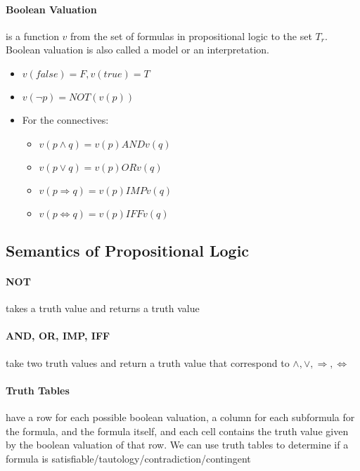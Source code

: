 \documentclass[12pt]{report}
\begin{document}
        \paragraph{Boolean Valuation} is a function $v$ from the set of
        formulas in propositional logic to the set $T_r$. Boolean valuation is
        also called a model or an interpretation.
        \begin{itemize}
          \item $v(false) = F, v(true) = T$
          \item $v(\lnot p) = NOT (v(p))$
          \item For the connectives:
          \begin{itemize}
            \item $v(p\land q) = v(p) AND v(q)$
            \item $v(p\lor q) = v(p) OR v(q)$
            \item $v(p\Rightarrow q) = v(p) IMP v(q)$
            \item $v(p\Leftrightarrow q) = v(p) IFF v(q)$
          \end{itemize}
        \end{itemize}

      \subsection{Semantics of Propositional Logic}
        \paragraph{NOT} takes a truth value and returns a truth value
        \paragraph{AND, OR, IMP, IFF} take two truth values and return a truth
        value that correspond to $\land, \lor, \Rightarrow, \Leftrightarrow$

        \paragraph{Truth Tables} have a row for each possible boolean valuation,
          a column for each subformula for the formula, and the formula itself,
          and each cell contains the truth value given by the boolean valuation
          of that row. We can use truth tables to determine if a formula is
          satisfiable/tautology/contradiction/contingent
\end{document}
